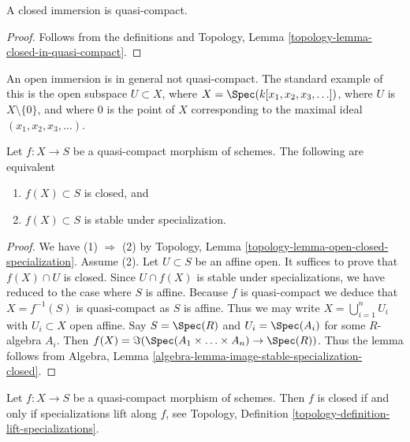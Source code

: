 \begin{lemma}
\label{lemma-closed-immersion-quasi-compact}
A closed immersion is quasi-compact.
\end{lemma}

\begin{proof}
Follows from the definitions and
Topology, Lemma \ref{topology-lemma-closed-in-quasi-compact}.
\end{proof}

\begin{example}
\label{example-open-immersion-not-quasi-compact}
An open immersion is in general not quasi-compact.
The standard example of this is the open subspace
$U \subset X$, where $X = \Spec(k[x_1, x_2, x_3, \ldots])$,
where $U$ is $X \setminus \{0\}$, and where $0$ is the point
of $X$ corresponding to the maximal ideal
$(x_1, x_2, x_3, \ldots)$.
\end{example}

\begin{lemma}
\label{lemma-image-quasi-compact-closed}
Let $f : X \to S$ be a quasi-compact morphism of schemes.
The following are equivalent
\begin{enumerate}
\item $f(X) \subset S$ is closed, and
\item $f(X) \subset S$ is stable under specialization.
\end{enumerate}
\end{lemma}

\begin{proof}
We have (1) $\Rightarrow$ (2) by
Topology, Lemma \ref{topology-lemma-open-closed-specialization}.
Assume (2). Let $U \subset S$ be an affine open. It suffices to prove
that $f(X) \cap U$ is closed. Since $U \cap f(X)$ is stable under
specializations, we have reduced to the case where $S$ is affine.
Because $f$ is quasi-compact we deduce that $X = f^{-1}(S)$ is
quasi-compact as $S$ is affine. Thus we may write
$X = \bigcup_{i = 1}^n U_i$ with $U_i \subset X$ open affine.
Say $S = \Spec(R)$ and
$U_i = \Spec(A_i)$ for some $R$-algebra $A_i$.
Then $f(X) = \Im(\Spec(A_1 \times \ldots \times A_n)
\to \Spec(R))$. Thus the lemma follows from
Algebra, Lemma \ref{algebra-lemma-image-stable-specialization-closed}.
\end{proof}

\begin{lemma}
\label{lemma-quasi-compact-closed}
Let $f : X \to S$ be a quasi-compact morphism of schemes.
Then $f$ is closed if and only if specializations lift
along $f$, see
Topology, Definition \ref{topology-definition-lift-specializations}.
\end{lemma}

